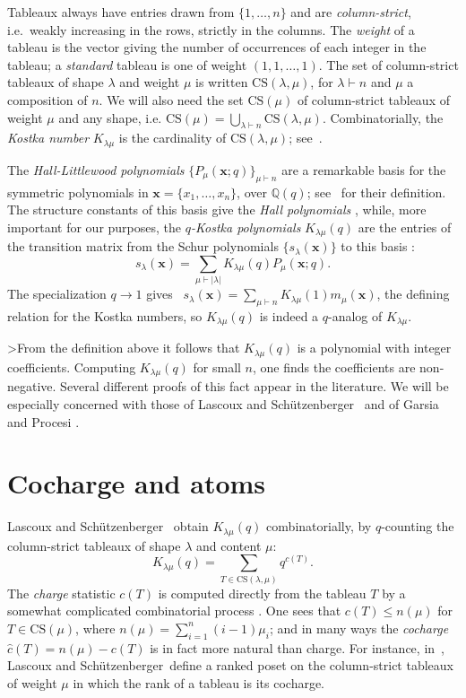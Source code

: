 \documentclass[12pt]{article}
\newcommand{\Q}{\mathbb{Q}}
\newcommand{\set}[1]{\{#1\}}
\newcommand{\la}{{\lambda}}
\newcommand{\ptn}{\vdash}
\newcommand{\size}[1]{\left|#1\right|}
\newcommand{\Klm}{K_{\la \mu}}
\newcommand{\x}{\mathbf{x}}
\newcommand{\var}[2]{{#1}_{1},\dots,{#1}_{#2}}
\newcommand{\charge}{c}
\newcommand{\cocharge}{\hat{c}}
\newcommand{\chg}{\charge}
\newcommand{\ccg}{\cocharge}
\newcommand{\nmu}{n(\mu)}
\newcommand{\CSlm}{\text{CS}(\la,\mu)}
\newcommand{\CSm}{\text{CS}(\mu)}
\newcommand{\schur}[1]{s_{#1}(\x)}
\newcommand{\mon}[1]{m_{#1}(\x)}
\newcommand{\HL}[2][q]{P_{#2}(\x;#1)}
\newcommand{\LS}{Lascoux and Sch\"{u}tzenberger}
\numberwithin{equation}{section}
\theoremstyle{plain}
\theoremstyle{definition}
\theoremstyle{remark}
\begin{document}
Tableaux always have entries drawn from $\set{1,\dots,n}$ and are {\em
column-strict}, i.e.\ weakly increasing in the rows, strictly in the
columns.  The {\em weight} of a tableau is the vector giving the
number of occurrences of each integer in the tableau; a {\em standard}
tableau is one of weight $(1,1,\dots,1)$.  The set of column-strict
tableaux of shape $\la$ and weight $\mu$ is written $\CSlm$, for
$\la\ptn n$ and $\mu$ a composition of $n$.  We will also need the set
$\CSm$ of column-strict tableaux of weight $\mu$ and any shape,
i.e. $\CSm = \bigcup_{\la\ptn n} \CSlm$.  Combinatorially, the {\em
Kostka number} $\Klm$ is the cardinality of $\CSlm$;
see~\cite[I.6]{Macdonald}.  

The {\em Hall-Littlewood polynomials} $\set{\HL{\mu}}_{\mu\ptn n}$ are
a remarkable basis for the symmetric polynomials in $\x=\set{\var
xn}$, over $\Q(q)$; see~\cite[Chapter~III]{Macdonald} for their
definition.  The structure constants of this basis give the {\em Hall
polynomials} \cite[III.3]{Macdonald}, while, more important for our
purposes, the {\em $q$-Kostka polynomials} $\Klm(q)$ are the entries
of the transition matrix from the Schur polynomials
$\set{\schur{\la}}$ to this basis \cite[III.6]{Macdonald}:
\begin{equation}
\schur{\la} = \sum_{\mu\ptn \size{\la}}\Klm(q) \HL{\mu}.
\end{equation}
The specialization $q\to1$ gives~\cite[III.2]{Macdonald}
$\schur{\la}=\sum_{\mu\ptn n}\Klm(1)\mon{\mu}$,
the defining relation for the Kostka numbers, 
so $\Klm(q)$ is indeed a $q$-analog of $\Klm$.

>From the definition above it follows that $\Klm(q)$ is a polynomial
with integer coefficients.  Computing $\Klm(q)$ for small $n$, one
finds the coefficients are non-negative. Several different proofs of
this fact appear in the literature.  We will be especially concerned
with those of \LS~\cite{Schutzenberger78,L&S:Plaxique} and of Garsia and
Procesi \cite{Garsia&Procesi}.

\section{Cocharge and atoms}
\label{KlmtSubSec}
\LS\ \cite{Schutzenberger78,L&S:Plaxique, L&S:Croissance} obtain
$\Klm(q)$ combinatorially, by $q$-counting the column-strict tableaux
of shape $\la$ and content $\mu$:
\begin{equation}
\Klm(q) = \sum_{T\in \CSlm}q^{\chg(T)}.
\end{equation}
The {\em charge} statistic $\chg(T)$ is computed directly from the
tableau $T$ by a somewhat complicated combinatorial process
\cite[p.242]{Macdonald}.  One sees that $\chg(T)\leq \nmu$
for $T\in \CSm$, where $\nmu=\sum_{i=1}^{n}(i-1)\mu_{i}$; and 
in many ways the {\em
cocharge} $\ccg(T) = \nmu-\chg(T)$ is in fact more natural than
charge.  For instance, in~\cite{L&S:Plaxique}, \LS\ define a ranked
poset on the column-strict tableaux of weight $\mu$ in which the rank
of a tableau is its cocharge.  
\end{document}
